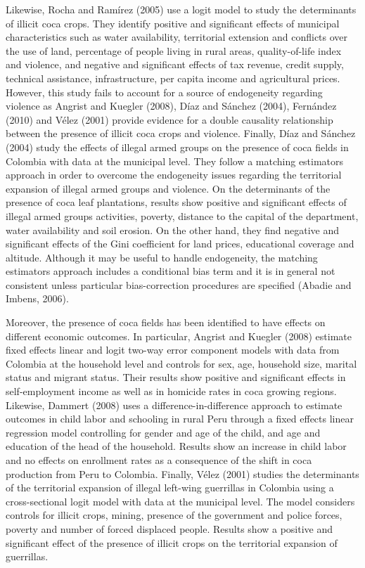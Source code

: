 \documentclass[12pt,a4paper,english]{article}%
\begin{document}
Likewise, Rocha and Ram\'{i}rez (2005) use a logit model to study the determinants of illicit coca crops. They identify positive and significant effects of municipal characteristics such as water availability, territorial extension and conflicts over the use of land, percentage of people living in rural areas, quality-of-life index and violence, and negative and significant effects of tax revenue, credit supply, technical assistance, infrastructure, per capita income and agricultural prices. However, this study fails to account for a source of endogeneity regarding violence as Angrist and Kuegler (2008), D\'{i}az and S\'{a}nchez (2004), Fern\'{a}ndez (2010) and V\'{e}lez (2001) provide evidence for a double causality relationship between the presence of illicit coca crops and violence. Finally, D\'{i}az and S\'{a}nchez (2004) study the effects of illegal armed groups on the presence of coca fields in Colombia with data at the municipal level. They follow a matching estimators approach in order to overcome the endogeneity issues regarding the territorial expansion of illegal armed groups and violence. On the determinants of the presence of coca leaf plantations, results show positive and significant effects of illegal armed groups activities, poverty, distance to the capital of the department, water availability and soil erosion. On the other hand, they find negative and significant effects of the Gini coefficient for land prices, educational coverage and altitude.  Although it may be useful to handle endogeneity, the matching estimators approach includes a conditional bias term and it is in general not consistent unless particular bias-correction procedures are specified (Abadie and Imbens, 2006).

Moreover, the presence of coca fields has been identified to have effects on different economic outcomes. In particular, Angrist and Kuegler (2008) estimate fixed effects linear and logit two-way error component models with data from Colombia at the household level and controls for sex, age, household size, marital status and migrant status. Their results show positive and significant effects in self-employment income as well as in homicide rates in coca growing regions. Likewise, Dammert (2008) uses a difference-in-difference approach to estimate outcomes in child labor and schooling in rural Peru through a fixed effects linear regression model controlling for gender and age of the child, and age and education of the head of the household. Results show an increase in child labor and no effects on enrollment rates as a consequence of the shift in coca production from Peru to Colombia. Finally, V\'{e}lez (2001) studies the determinants of the territorial expansion of illegal left-wing guerrillas in Colombia using a cross-sectional logit model with data at the municipal level. The model considers controls for illicit crops, mining, presence of the government and police forces, poverty and number of forced displaced people. Results show a positive and significant effect of the presence of illicit crops on the territorial expansion of guerrillas. 
\end{document}
